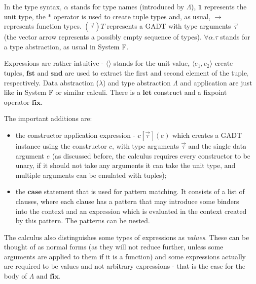 In the type syntax, $\alpha$ stands for type names (introduced by $\Lambda$), $\mathbf{1}$ represents the unit type, the $*$ operator is used to create tuple types and, as usual, $\to$ represents function types. $(\overrightarrow{\tau}) T$ represents a GADT with type arguments $\overrightarrow{\tau}$ (the vector arrow represents a possibly empty sequence of types). $\forall \alpha. \tau$ stands for a type abstraction, as usual in System F.

Expressions are rather intuitive - $\langle\rangle$ stands for the unit value, $\langle e_1, e_2 \rangle$ create tuples, $\mathbf{fst}$ and $\mathbf{snd}$ are used to extract the first and second element of the tuple, respectively. Data abstraction ($\lambda$) and type abstraction $\Lambda$ and application are just like in System F or similar calculi. There is a $\mathbf{let}$ construct and a fixpoint operator $\mathbf{fix}$.

The important additions are:
\begin{itemize}
  \item the constructor application expression - $c[\overrightarrow{\tau}](e)$ which creates a GADT instance using the constructor $c$, with type arguments $\overrightarrow{\tau}$ and the single data argument $e$ (as discussed before, the calculus requires every constructor to be unary, if it should not take any arguments it can take the unit type, and multiple arguments can be emulated with tuples);
  \item the $\mathbf{case}$ statement that is used for pattern matching. It consists of a list of clauses, where each clause has a pattern that may introduce some binders into the context and an expression which is evaluated in the context created by this pattern. The patterns can be nested.
\end{itemize}

The calculus also distinguishes some types of expressions as \textit{values}. These can be thought of as normal forms (as they will not reduce further, unless some arguments are applied to them if it is a function) and some expressions actually are required to be values and not arbitrary expressions - that is the case for the body of $\Lambda$ and $\mathbf{fix}$.


